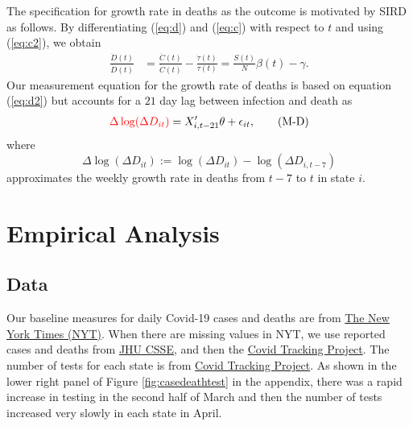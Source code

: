 \documentclass[3p, longtitle]{elsarticle}
\theoremstyle{definition}
\def\ycolor{\color{red}}
\begin{document}
The specification for growth rate in deaths as the outcome  is motivated by SIRD as follows. By differentiating (\ref{eq:d}) and (\ref{eq:c}) with respect to $t$ and using (\ref{eq:c2}), we obtain
\begin{align}
\frac{\ddot{D}(t) }{\dot D(t)}& = \frac{\ddot{C}(t) }{\dot C(t)}  - \frac{\dot{\tau}(t) }{ \tau(t)}    =  \frac{S(t)}{N}\beta(t)  -   \gamma.\label{eq:d2}
\end{align}
Our measurement equation for the growth rate of deaths is based on equation (\ref{eq:d2}) but   accounts for a $21$ day lag between infection and death as
\begin{align}
{\ycolor \Delta \log(\Delta D_{it})}  = X_{i,t-21}' \theta + \epsilon_{it},\label{eq:M-D} \tag{M-D}
\end{align}
where
\begin{equation} \label{eq:y-d}
 \Delta \log(\Delta D_{it}):= \log( \Delta D_{it} ) -
\log( \Delta D_{i,t-7})
\end{equation}
approximates the weekly growth rate in deaths from $t-7$ to $t$ in state $i$. %


\section{Empirical Analysis}
\subsection{Data}

Our baseline measures for daily Covid-19   cases and deaths are from
\href{https://github.com/nytimes/covid-19-data}{The New York Times (NYT)}. When there are missing values in NYT, we use reported cases and deaths from \href{https://github.com/CSSEGISandData/COVID-19}{JHU CSSE}, and then the
\href{https://github.com/COVID19Tracking/covid-tracking-data}{Covid
Tracking Project}.  The number of tests for each state is from  \href{https://github.com/COVID19Tracking/covid-tracking-data}{Covid
 Tracking Project}. As shown in the lower right panel of Figure \ref{fig:casedeathtest} in the appendix, there was a rapid increase in testing in the second half of March and then the
number of tests increased very slowly in each state in April.
\end{document}
